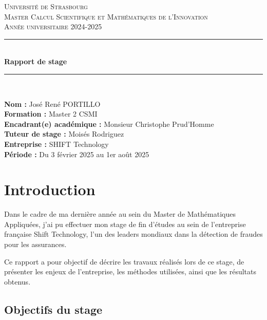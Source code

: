 \documentclass[12pt]{report}
\begin{document}
\begin{titlepage}
    \centering
    
    \textsc{\LARGE Université de Strasbourg}\\[0.5cm]
    \textsc{\Large Master Calcul Scientifique et Mathématiques de l'Innovation}\\[1.5cm]
    \textsc{\Large Année universitaire 2024-2025}\\[1.5cm]
    
    \rule{\linewidth}{0.5mm} \\[0.4cm]
    {\huge \bfseries Rapport de stage}\\[0.4cm]
    \rule{\linewidth}{0.5mm} \\[1.5cm]
    
    
    \begin{flushleft}
        \textbf{Nom :} José René PORTILLO\\
        \textbf{Formation :} Master 2 CSMI\\
        \textbf{Encadrant(e) académique :} Monsieur Christophe Prud'Homme\\
        \textbf{Tuteur de stage :} Moisés Rodriguez\\
        \textbf{Entreprise :} SHIFT Technology\\
        \textbf{Période :} Du 3 février 2025 au 1er août 2025
    \end{flushleft}
    
    \vfill
    
    
    
\end{titlepage}


\chapter{Introduction}

Dans le cadre de ma dernière année au sein du Master de Mathématiques Appliquées, 
j'ai pu effectuer mon stage de fin d'études au sein de l'entreprise française Shift Technology, 
l'un des leaders mondiaux dans la détection de fraudes pour les assurances.

Ce rapport a pour objectif de décrire les travaux réalisés lors de ce stage, 
de présenter les enjeux de l'entreprise, les méthodes utilisées, ainsi que les résultats obtenus.

\section{Objectifs du stage}
\end{document}
